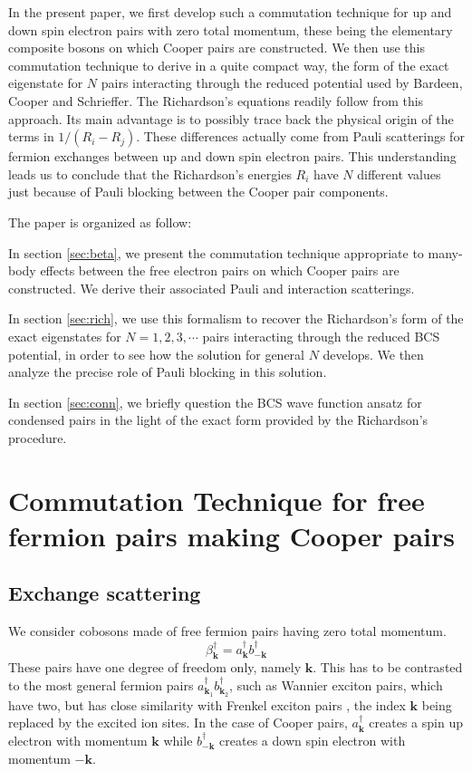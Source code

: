 \documentclass[aps,prb,superscriptaddress,showpacs,reprint,lengthcheck]{revtex4-1}
\newcommand{\vk}{\ensuremath{\mathbf{k}}}
\begin{document}
In the present paper, we first develop such a commutation technique for up and down spin
electron pairs with zero total momentum, these being the elementary composite bosons on which Cooper pairs are constructed. We then use this commutation technique to derive in a quite
compact way, the form of the exact eigenstate for $N$ pairs interacting
through the reduced potential used by Bardeen, Cooper and Schrieffer. The Richardson's equations readily follow
from this approach. Its main advantage is to possibly trace back the physical origin of the terms in $1/(R_i-R_j)$. These differences actually come
from Pauli scatterings for fermion exchanges 
between up and down spin electron pairs. This understanding leads us to conclude that 
the Richardson's energies $R_i$  have $N$ different values just because 
of Pauli blocking between the Cooper pair components.

The paper is organized as follow:

In section \ref{sec:beta}, we present the commutation technique  appropriate to many-body effects between the free
electron pairs on which Cooper pairs are constructed. We derive their associated Pauli and interaction scatterings.

In section \ref{sec:rich}, we use this formalism to recover the Richardson's form of the
exact eigenstates for $N=1,2,3,\cdots$ pairs interacting through the reduced
BCS potential, in order to see how the solution for general $N$ develops. We
then analyze the precise role of Pauli blocking in this solution.

In section \ref{sec:conn}, we briefly question the BCS wave function ansatz for condensed pairs in the light of the exact form provided by the Richardson's procedure.

\section{Commutation Technique for free fermion pairs making Cooper pairs\label{sec:beta}}

\subsection{Exchange scattering}

We consider cobosons made of free fermion pairs having zero total
momentum. 
\begin{equation}
\beta^{\dagger}_\vk=a^{\dagger}_{\mathbf{k} }b^{\dagger}_{-\mathbf{k} }
\end{equation}
These pairs have one degree of freedom
only, namely $\mathbf{k}$. This has to be  contrasted to the
most general fermion pairs $a^{\dagger}_{\mathbf{k} _1}b^{\dagger}_{\mathbf{k%
} _2}$, such as Wannier exciton pairs, which have two, but has close similarity with Frenkel exciton pairs \cite{frenkel}, the index $\mathbf{k}$ being replaced by the excited ion sites. In the case of Cooper pairs, $a^{\dagger}_{\mathbf{k} }$ creates a spin up electron with momentum $\mathbf{k}$ while $b^{\dagger}_{\mathbf{-k} }$ creates a down spin electron with momentum $\mathbf{-k}$. 
\end{document}
